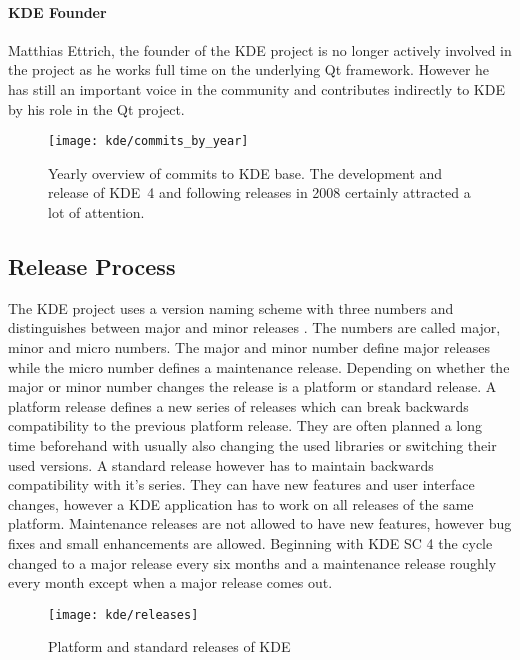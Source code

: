 \paragraph{KDE Founder}

Matthias Ettrich, the founder of the KDE project is no longer actively involved
in the project as he works full time on the underlying Qt framework. However he
has still an important voice in the community and contributes indirectly to KDE
by his role in the Qt project.

\begin{figure}[htbp]
  \centering
  \texttt{[image: kde/commits\_by\_year]}
  \caption{Yearly overview of commits to KDE base. The development and release of KDE~4 and
  following releases in 2008 certainly attracted a lot of attention.}
\end{figure}


\subsection{Release Process} %

The KDE project uses a version naming scheme with three numbers and
distinguishes between major and minor releases
\cite{KDEReleaseTeam,KDEReleaseSchedule,KDESchedule}. The numbers are called
major, minor and micro numbers. The major and minor number define major
releases while the micro number defines a maintenance release. Depending on
whether the major or minor number changes the release is a platform or standard
release. A platform release defines a new series of releases which can break
backwards compatibility to the previous platform release. They are often
planned a long time beforehand with usually also changing the used libraries or
switching their used versions. A standard release however has to maintain
backwards compatibility with it's series. They can have new features and user
interface changes, however a KDE application has to work on all releases of the
same platform. Maintenance releases are not allowed to have new features,
however bug fixes and small enhancements are allowed. Beginning with \ac{KDE
SC} 4 the cycle changed to a major release every six months and a maintenance
release roughly every month except when a major release comes out.

\begin{figure}[htbp]
  \centering
  \texttt{[image: kde/releases]}
  \caption{Platform and standard releases of KDE}
\end{figure}

